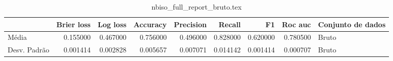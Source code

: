 \begin{table}
\centering
\caption{nbiso_full_report_bruto.tex}
\label{nbiso_full_report_bruto.tex}
\begin{tabular}{lrrrrrrrl}
\toprule
{} &  Brier  loss &  Log loss &  Accuracy  &  Precision  &   Recall  &       F1  &  Roc auc  & Conjunto de dados \\
\midrule
Média        &     0.155000 &  0.467000 &   0.756000 &    0.496000 &  0.828000 &  0.620000 &  0.780500 &             Bruto \\
Desv. Padrão &     0.001414 &  0.002828 &   0.005657 &    0.007071 &  0.014142 &  0.001414 &  0.000707 &             Bruto \\
\bottomrule
\end{tabular}
\end{table}
